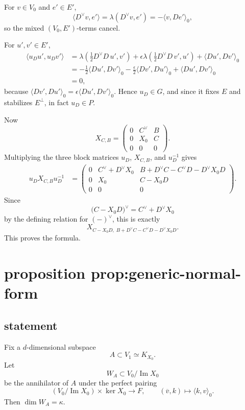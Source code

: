 \documentclass[
  11pt,
]{article}
\begin{document}
For \(v\in V_0\) and \(e'\in E'\), \[
\langle D^\vee v,e'\rangle=\lambda(D^\vee v,e')=-\langle v,De'\rangle_0,
\] so the mixed \((V_0,E')\)-terms cancel.

For \(u',v'\in E'\), \begin{align*}
\langle u_Du',u_Dv'\rangle
&=\lambda\!\left(\frac12 D^\vee D\,u',v'\right)
+\epsilon\lambda\!\left(\frac12 D^\vee D\,v',u'\right)
+\langle Du',Dv'\rangle_0 \\
&=-\frac12\langle Du',Dv'\rangle_0
-\frac{\epsilon}{2}\langle Dv',Du'\rangle_0
+\langle Du',Dv'\rangle_0 \\
&=0,
\end{align*} because
\(\langle Dv',Du'\rangle_0=\epsilon\langle Du',Dv'\rangle_0\). Hence
\(u_D\in G\), and since it fixes \(E\) and stabilizes \(E^\perp\), in
fact \(u_D\in P\).

Now \[
X_{C,B}=
\begin{pmatrix}
0&C^\vee&B\\
0&X_0&C\\
0&0&0
\end{pmatrix}.
\] Multiplying the three block matrices \(u_D\), \(X_{C,B}\), and
\(u_D^{-1}\) gives \begin{align*}
u_DX_{C,B}u_D^{-1}
&=
\begin{pmatrix}
0&C^\vee+D^\vee X_0&B+D^\vee C-C^\vee D-D^\vee X_0D\\
0&X_0&C-X_0D\\
0&0&0
\end{pmatrix}.
\end{align*} Since \[
\bigl(C-X_0D\bigr)^\vee=C^\vee+D^\vee X_0
\] by the defining relation for \((-)^\vee\), this is exactly \[
X_{C-X_0D,\;B+D^\vee C-C^\vee D-D^\vee X_0D}.
\] This proves the formula.

\section{proposition
prop:generic-normal-form}\label{proposition-propgeneric-normal-form}

\subsection{statement}\label{statement-3}

Fix a \(d\)-dimensional subspace \[
A\subset V_1\simeq K_{X_0}.
\] Let \[
W_A\subset V_0/\operatorname{Im} X_0
\] be the annihilator of \(A\) under the perfect pairing \[
(V_0/\operatorname{Im} X_0)\times \ker X_0\to F,
\qquad (\overline v,k)\mapsto \langle k,v\rangle_0.
\] Then \(\dim W_A=\kappa\).
\end{document}
